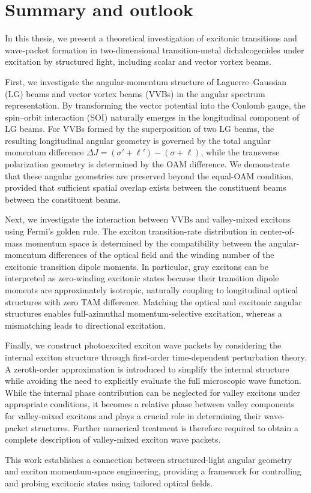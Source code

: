 \chapter{Summary and outlook}
\label{ch:conclusion}
In this thesis, we present a theoretical investigation of excitonic transitions and wave-packet formation in two-dimensional transition-metal dichalcogenides under excitation by structured light, including scalar and vector vortex beams.

First, we investigate the angular-momentum structure of Laguerre--Gaussian (LG) beams and vector vortex beams (VVBs) in the angular spectrum representation. By transforming the vector potential into the Coulomb gauge, the spin--orbit interaction (SOI) naturally emerges in the longitudinal component of LG beams. For VVBs formed by the superposition of two LG beams, the resulting longitudinal angular geometry is governed by the total angular momentum difference $\Delta J=(\sigma'+\ell')-(\sigma+\ell)$, while the transverse polarization geometry is determined by the OAM difference. We demonstrate that these angular geometries are preserved beyond the equal-OAM condition, provided that sufficient spatial overlap exists between the constituent beams between the constituent beams.

Next, we investigate the interaction between VVBs and valley-mixed excitons using Fermi's golden rule. The exciton transition-rate distribution in center-of-mass momentum space is determined by the compatibility between the angular-momentum differences of the optical field and the winding number of the excitonic transition dipole moments. In particular, gray excitons can be interpreted as zero-winding excitonic states because their transition dipole moments are approximately isotropic, naturally coupling to longitudinal optical structures with zero TAM difference. Matching the optical and excitonic angular structures enables full-azimuthal momentum-selective excitation, whereas a mismatching leads to directional excitation.

Finally, we construct photoexcited exciton wave packets by considering the internal exciton structure through first-order time-dependent perturbation theory. A zeroth-order approximation is introduced to simplify the internal structure while avoiding the need to explicitly evaluate the full microscopic wave function. While the internal phase contribution can be neglected for valley excitons under appropriate conditions, it becomes a relative phase between valley components for valley-mixed excitons and plays a crucial role in determining their wave-packet structures. Further numerical treatment is therefore required to obtain a complete description of valley-mixed exciton wave packets.

This work establishes a connection between structured-light angular geometry and exciton momentum-space engineering, providing a framework for controlling and probing excitonic states using tailored optical fields.
